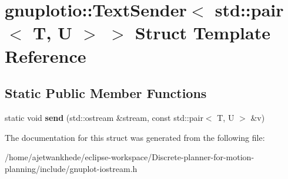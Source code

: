 \hypertarget{structgnuplotio_1_1TextSender_3_01std_1_1pair_3_01T_00_01U_01_4_01_4}{}\section{gnuplotio\+:\+:Text\+Sender$<$ std\+:\+:pair$<$ T, U $>$ $>$ Struct Template Reference}
\label{structgnuplotio_1_1TextSender_3_01std_1_1pair_3_01T_00_01U_01_4_01_4}
\subsection*{Static Public Member Functions}
\begin{DoxyCompactItemize}
\item 
\mbox{\label{structgnuplotio_1_1TextSender_3_01std_1_1pair_3_01T_00_01U_01_4_01_4_ae1f3a6ffd8a60bb73d787578327154d1}} 
static void {\bfseries send} (std\+::ostream \&stream, const std\+::pair$<$ T, U $>$ \&v)
\end{DoxyCompactItemize}


The documentation for this struct was generated from the following file\+:\begin{DoxyCompactItemize}
\item 
/home/ajetwankhede/eclipse-\/workspace/\+Discrete-\/planner-\/for-\/motion-\/planning/include/gnuplot-\/iostream.\+h\end{DoxyCompactItemize}
